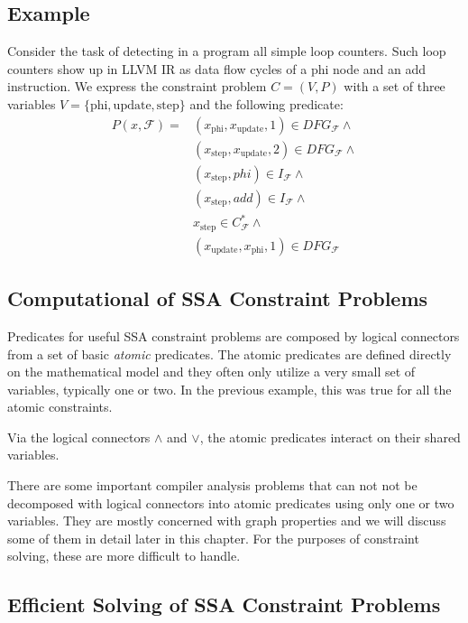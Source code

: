\subsection{Example}
    Consider the task of detecting in a program all simple loop counters.
    Such loop counters show up in LLVM IR as data flow cycles of a phi node
    and an add instruction.
    We express the constraint problem $C=(V,P)$ with a set of three variables
    $V=\{\text{phi}, \text{update}, \text{step}\}$ and the following predicate:
    \begin{align*}
        P(x,\mathcal F)=&(x_\text{phi},x_\text{update},1)\in DFG_\mathcal{F}\land\\
                        &(x_\text{step},x_\text{update},2)\in DFG_\mathcal{F}\land\\
                        &(x_\text{step}, phi)\in I_\mathcal{F}\land\\
                        &(x_\text{step}, add)\in I_\mathcal{F}\land\\
                        &x_\text{step}\in C_\mathcal{F}^*\land\\
                        &(x_\text{update},x_\text{phi},1)\in DFG_\mathcal{F}
    \end{align*}


\subsection{Computational of SSA Constraint Problems}

    Predicates for useful SSA constraint problems are composed by logical
    connectors from a set of basic {\em atomic} predicates.
    The atomic predicates are defined directly on the mathematical model and
    they often only utilize a very small set of variables, typically one or two.
    In the previous example, this was true for all the atomic constraints.

    Via the logical connectors $\land$ and $\lor$, the atomic predicates
    interact on their shared variables.

    There are some important compiler analysis problems that can not not be
    decomposed with logical connectors into atomic predicates using only one
    or two variables.
    They are mostly concerned with graph properties and we will discuss some of
    them in detail later in this chapter.
    For the purposes of constraint solving, these are more difficult to handle.

\subsection{Efficient Solving of SSA Constraint Problems}


